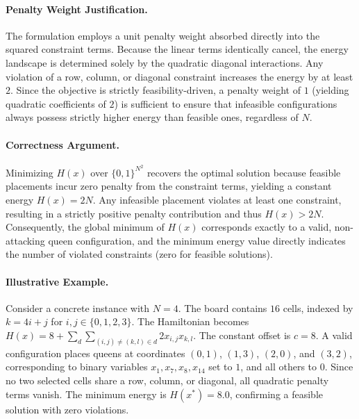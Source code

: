 \documentclass[12pt]{article}
\begin{document}
\paragraph{Penalty Weight Justification.}
The formulation employs a unit penalty weight absorbed directly into the squared constraint terms. Because the linear terms identically cancel, the energy landscape is determined solely by the quadratic diagonal interactions. Any violation of a row, column, or diagonal constraint increases the energy by at least $2$. Since the objective is strictly feasibility-driven, a penalty weight of $1$ (yielding quadratic coefficients of $2$) is sufficient to ensure that infeasible configurations always possess strictly higher energy than feasible ones, regardless of $N$.

\paragraph{Correctness Argument.}
Minimizing $H(x)$ over $\{0,1\}^{N^2}$ recovers the optimal solution because feasible placements incur zero penalty from the constraint terms, yielding a constant energy $H(x) = 2N$. Any infeasible placement violates at least one constraint, resulting in a strictly positive penalty contribution and thus $H(x) > 2N$. Consequently, the global minimum of $H(x)$ corresponds exactly to a valid, non-attacking queen configuration, and the minimum energy value directly indicates the number of violated constraints (zero for feasible solutions).

\paragraph{Illustrative Example.}
Consider a concrete instance with $N=4$. The board contains $16$ cells, indexed by $k = 4i + j$ for $i,j \in \{0,1,2,3\}$. The Hamiltonian becomes $H(x) = 8 + \sum_{d} \sum_{(i,j)\neq(k,l)\in d} 2 x_{i,j} x_{k,l}$. The constant offset is $c=8$. A valid configuration places queens at coordinates $(0,1)$, $(1,3)$, $(2,0)$, and $(3,2)$, corresponding to binary variables $x_1, x_7, x_8, x_{14}$ set to $1$, and all others to $0$. Since no two selected cells share a row, column, or diagonal, all quadratic penalty terms vanish. The minimum energy is $H(x^*) = 8.0$, confirming a feasible solution with zero violations.
\end{document}
